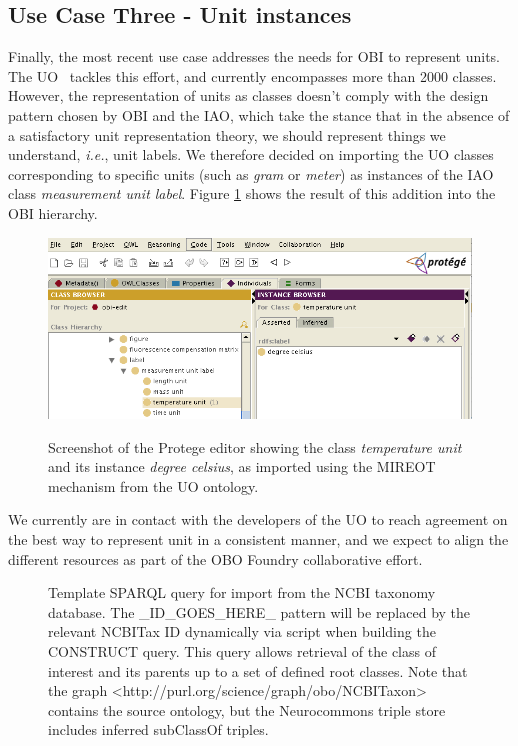 \documentclass[jou]{ao2e}%
\begin{document}
\subsection{Use Case Three - Unit instances}

Finally, the most recent use case addresses the needs for \ac{OBI} to represent units. The \ac{UO}~\citep{PATO} tackles this effort, and currently encompasses more than 2000 classes. 
However, the representation of units as classes doesn't comply with the design pattern chosen by \ac{OBI} and the \ac{IAO}, which take the stance that in the absence of a satisfactory unit representation theory, we should represent things we understand, \emph{i.e.}, unit labels. 
We therefore decided on importing the \ac{UO} classes corresponding to specific units (such as \textit{gram} or \textit{meter}) as instances of the \ac{IAO} class \textit{measurement unit label}.
Figure \ref{fig:protege} shows the result of this addition into the \ac{OBI} hierarchy.

\begin{figure}[t]
\centering
{
\includegraphics[width=.9\linewidth]{./figs/protege.png}
}
\caption{Screenshot of the Protege editor showing the class \textit{temperature unit} and its instance \textit{degree celsius}, as imported using the \ac{MIREOT} mechanism from the \ac{UO} ontology.
}
\label{fig:protege}
\end{figure}

We currently are in contact with the developers of the \ac{UO} to reach agreement on the best way to represent unit in a consistent manner, and we expect to align the different resources as part of the \ac{OBO} Foundry collaborative effort.


\begin{figure}[t]
\scriptsize
 
\caption{Template SPARQL query for import from the NCBI taxonomy database. The \_ID\_GOES\_HERE\_ pattern will be replaced by the relevant NCBITax ID dynamically via script when building the CONSTRUCT query. This query allows retrieval of the class of interest and its parents up to a set of defined root classes. Note that the graph <http://purl.org/science/graph/obo/NCBITaxon> contains the source ontology, but the Neurocommons triple store includes inferred subClassOf triples.}
\label{fig:sparql2}
\end{figure}
\end{document}
